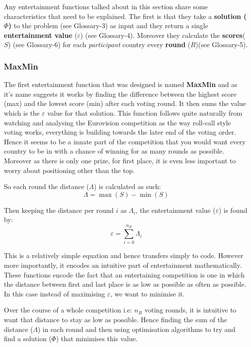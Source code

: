 \documentclass[12pt]{report}
\begin{document}
Any entertainment functions talked about in this section share some characteristics that need to be explained. The first is that they take a \textbf{solution ($\Phi$)} to the problem (see Glossary-3) as input and they return a single \textbf{entertainment value} ($\varepsilon$) (see Glossary-4). Moreover they calculate the \textbf{scores}($S$) (see Glossary-6) for each \textit{participant} country every \textbf{round} ($R$)(see Glossary-5).

\subsubsection{MaxMin}
The first entertainment function that was designed is named \textbf{MaxMin} and as it's name suggests it works by finding the difference between the highest score (max) and the lowest score (min) after each voting round. It then sums the value which is the $\varepsilon$ value for that solution. This function follows quite naturally from watching and analysing the Eurovision competition as the way roll-call style voting works, everything is building towards the later end of the voting order. Hence it seems to be a innate part of the competition that you would want every country to be in with a chance of winning for as many rounds as possible. Moreover as there is only one prize, for first place, it is even less important to worry about positioning other than the top.

So each round the distance ($\Lambda$) is calculated as such:
\begin{equation}\label{lambda}
	\Lambda = \max(S) - \min(S)
\end{equation}

Then keeping the distance per round $i$ as $\Lambda_i$, the entertainment value ($\varepsilon$) is found by:
\begin{equation}\label{epsilon}
	\varepsilon = \sum_{i=0}^{n_R}  \Lambda_i
\end{equation}

This is a relatively simple equation and hence transfers simply to code. However more importantly, it encodes an intuitive part of entertainment mathematically. These functions encode the fact that an entertaining competition is one in which the distance between first and last place is as low as possible as often as possible. In this case instead of maximising $\varepsilon$, we want to minimise it.

Over the course of a whole competition i.e: $n_R$ voting rounds, it is intuitive to want that distance to stay as low as possible. Hence finding the sum of the distance ($\Lambda$) in each round and then using optimisation algorithms to try and find a solution ($\Phi$) that minimises this value.
\end{document}
